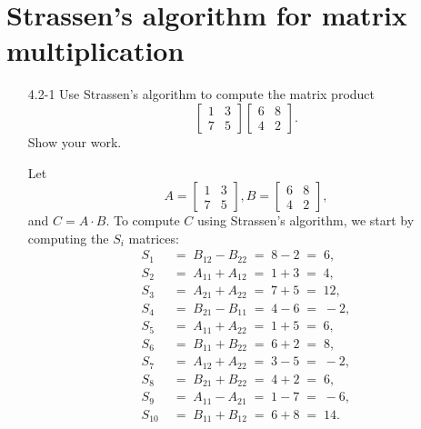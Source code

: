 \newpage

\section{Strassen's algorithm for matrix multiplication}

\begin{enumerate}

\item[4.2{-}1]{Use Strassen's algorithm to compute the matrix product
\[
\begin{bmatrix}
  1 & 3\\
  7 & 5
\end{bmatrix}
\begin{bmatrix}
  6 & 8\\
  4 & 2
\end{bmatrix}
.
\]
Show your work.
}

\begin{framed}
Let
\[
  A = \begin{bmatrix} 1 & 3\\ 7 & 5 \end{bmatrix},
  B = \begin{bmatrix} 6 & 8\\ 4 & 2 \end{bmatrix},
\]
and $C = A \cdot B$. To compute $C$ using Strassen's algorithm, we start by
computing the $S_i$ matrices:
\begin{equation*}
\begin{aligned}
S_1 \; &= \; B_{12} - B_{22} \; = \; 8 - 2 \; = \; 6,\\
S_2 \; &= \; A_{11} + A_{12} \; = \; 1 + 3 \; = \; 4,\\
S_3 \; &= \; A_{21} + A_{22} \; = \; 7 + 5 \; = \; 12,\\
S_4 \; &= \; B_{21} - B_{11} \; = \; 4 - 6 \; = \; -2,\\
S_5 \; &= \; A_{11} + A_{22} \; = \; 1 + 5 \; = \; 6,\\
S_6 \; &= \; B_{11} + B_{22} \; = \; 6 + 2 \; = \; 8,\\
S_7 \; &= \; A_{12} + A_{22} \; = \; 3 - 5 \; = \; -2,\\
S_8 \; &= \; B_{21} + B_{22} \; = \; 4 + 2 \; = \; 6,\\
S_9 \; &= \; A_{11} - A_{21} \; = \; 1 - 7 \; = \; -6,\\
S_{10} \; &= \; B_{11} + B_{12} \; = \; 6 + 8 \; = \; 14.
\end{aligned}
\end{equation*}


\end{framed}
\end{enumerate}
